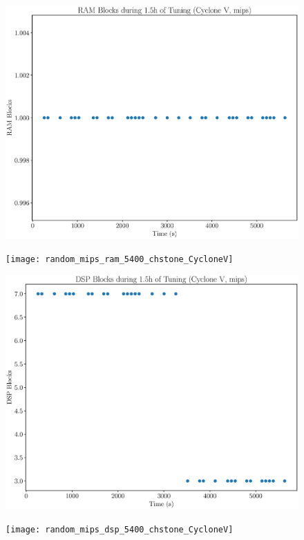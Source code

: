 \documentclass[12pt, a4paper]{article}
\begin{document}
\begin{figure}[htpb]
    \centering
    \noindent
    \begin{minipage}{.48\textwidth}
        \centering
        \includegraphics[scale=.25]{mips_ram_5400_chstone_CycloneV}
    \end{minipage}%
    \hfill
    \begin{minipage}{.48\textwidth}
        \centering
        \texttt{[image: random\_mips\_ram\_5400\_chstone\_CycloneV]}
    \end{minipage}%

    \begin{minipage}{.48\textwidth}
        \includegraphics[scale=.25]{mips_dsp_5400_chstone_CycloneV}
    \end{minipage}%
    \hfill
    \begin{minipage}{.48\textwidth}
        \texttt{[image: random\_mips\_dsp\_5400\_chstone\_CycloneV]}
    \end{minipage}%


\end{figure}
\end{document}
